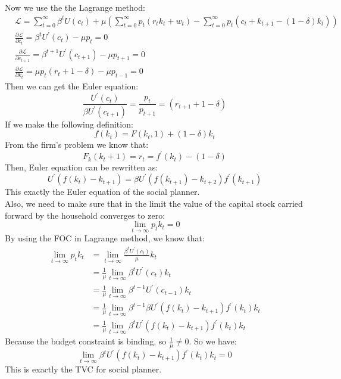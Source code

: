 \documentclass{article}
\begin{document}
\indent Now we use the the Lagrange method:
\begin{align*}
	&\mathscr{L} = \sum\limits^\infty_{t=0} \beta^t U(c_t) + \mu(\sum\limits^\infty_{t=0} p_t(r_t k_t + w_t) - \sum\limits^\infty_{t=0} p_t(c_t + k_{t+1} - (1 - \delta)k_t))\\
	&\frac{\partial \mathscr{L}}{\partial c_t} = \beta^t U^\prime(c_t) - \mu p_t = 0\\
	&\frac{\partial \mathscr{L}}{\partial c_{t+1}} = \beta^{t+1} U^\prime(c_{t+1}) - \mu p_{t+1} =0\\
	&\frac{\partial \mathscr{L}}{\partial k_t} = \mu p_t (r_t + 1 - \delta) - \mu p_{t-1} = 0
\end{align*}
\indent Then we can get the Euler equation:
\begin{equation*}
	\frac{U^\prime(c_t)}{\beta U^\prime(c_{t+1})} = \frac{p_t}{p_{t+1}} = (r_{t+1} + 1 - \delta)
\end{equation*}
\indent If we make the following definition:
\begin{equation*}
	f(k_t) = F(k_t, 1) + (1 - \delta)k_t
\end{equation*}
\indent From the firm's problem we know that:
\begin{equation*}
	F_k(k_t + 1) = r_{t} = f^\prime(k_t) - (1 - \delta)
\end{equation*}
\indent Then, Euler equation can be rewritten as:
\begin{equation*}
	U^\prime(f(k_t) - k_{t+1}) = \beta U^\prime(f(k_{t+1}) - k_{t+2})f^\prime(k_{t+1}) 
\end{equation*}
\indent This exactly the Euler equation of the social planner.\\
\indent Also, we need to make sure that in the limit the value of the capital stock carried forward by the household converges to zero:
\begin{equation*}
	\lim\limits_{t \to \infty} p_t k_t = 0
\end{equation*}
\indent By using the FOC in Lagrange method, we know that:
\begin{align*}
	\lim\limits_{t \to \infty} p_t k_t &= \lim\limits_{t \to \infty} \frac{\beta^t U^\prime(c_t)}{\mu} k_t\\
	&= \frac{1}{\mu} \lim\limits_{t \to \infty} \beta^t U^\prime(c_t) k_t\\
	&= \frac{1}{\mu} \lim\limits_{t \to \infty} \beta^{t-1} U^\prime(c_{t-1}) k_t\\
	&= \frac{1}{\mu} \lim\limits_{t \to \infty} \beta^{t-1} \beta U^\prime(f(k_{t}) - k_{t+1})f^\prime(k_{t}) k_t\\
	&= \frac{1}{\mu} \lim\limits_{t \to \infty} \beta^t U^\prime(f(k_{t}) - k_{t+1})f^\prime(k_{t}) k_t
\end{align*}
\indent Because the budget constraint is binding, so $\frac{1}{\mu} \neq 0$. So we have:
\begin{equation*}
	\lim\limits_{t \to \infty} \beta^t U^\prime(f(k_{t}) - k_{t+1})f^\prime(k_{t}) k_t = 0
\end{equation*}
\indent This is exactly the TVC for social planner.
\end{document}
